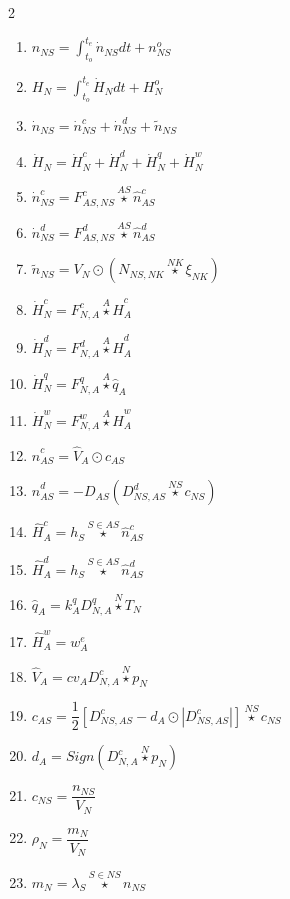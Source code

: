 \documentclass[10pt,a4paper]{report}
\begin{document}
	\begin{multicols}{2}
	\begin{enumerate}
		\item $n_{NS} = \int_{t_o}^{t_e} \dot{n}_{NS} dt + n^{o}_{NS}$
		\item $H_N = \int_{t_o}^{t_e} \dot{H}_N dt + H^o_N$	
		\item $\dot{n}_{NS} = \dot{n}^{c}_{NS} + \dot{n}^{d}_{NS} + \tilde{n}_{NS}$
		\item $\dot{H}_N = \dot{H}^c_N + \dot{H}^d_N + \dot{H}^q_N + \dot{H}^w_N$
		\item $\dot{n}^{c}_{NS} = F^{c}_{AS,NS} \overset{AS}{\star} \hat{n}^{c}_{AS}$
		\item $\dot{n}^{d}_{NS} = F^{d}_{AS,NS} \overset{AS}{\star} \hat{n}^{d}_{AS}$
		\item $\tilde{n}_{NS} = V_N \odot \left( N_{NS, NK} \overset{NK}{\star} \xi_{NK} \right)$
		\item $\dot{H}^c_N = F^{c}_{N,A} \overset{A}{\star} \hat{H}^c_A$
		\item $\dot{H}^d_N = F^{d}_{N,A} \overset{A}{\star} \hat{H}^d_A$
		\item $\dot{H}^q_N = F^{q}_{N,A} \overset{A}{\star} \hat{q}_A$
		\item $\dot{H}^w_N = F^{w}_{N,A} \overset{A}{\star} \hat{H}^w_A$		
		\item $\hat{n}^{c}_{AS} = \hat{V}_{A} \odot c_{AS}$
		\item $\hat{n}^{d}_{AS} = -D_{AS} \left( D^d_{NS,AS} \overset{NS}{\star} c_{NS} \right)$
		\item $\hat{H}^c_A = h_S \overset{S \in AS}{\star} \hat{n}^c_{AS}$
		\item $\hat{H}^d_A = h_S \overset{S \in AS}{\star} \hat{n}^d_{AS}$
		\item $\hat{q}_A = k^q_A D^q_{N,A} \overset{N}{\star} T_N$
		\item $\hat{H}^w_A = w^e_A$		
		\item $\hat{V}_{A} = cv_A D^{c}_{N,A} \overset{N}{\star} p_N$
		\item $c_{AS} = \dfrac{1}{2} \left[ D^{c}_{NS,AS} - d_A \odot \left|D^{c}_{NS,AS} \right|  \right] \overset{NS}{\star} c_{NS}$		
		\item $d_A = Sign(D^{c}_{N,A} \overset{N}{\star} p_N)$
		\item $c_{NS} = \dfrac{n_{NS}}{V_N}$		
		\item $\rho_N = \dfrac{m_N}{V_N}$		
		\item $m_N = \lambda_S \overset{S \in NS}{\star} n_{NS}$

\end{enumerate}
\end{multicols}
\end{document}
